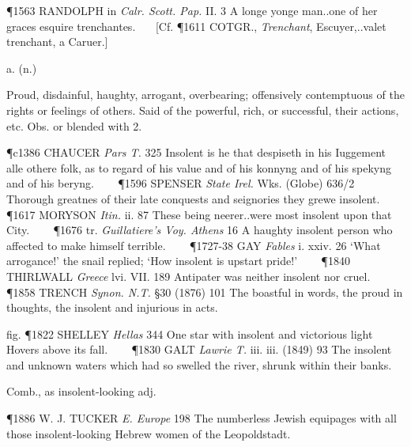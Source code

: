 \begin{description}[wide, labelwidth=!, labelindent=0pt]
\begin{myenumerate}
\P 1563 RANDOLPH in  \textit{Calr. Scott. Pap.} II. 3 A longe yonge man..one of her graces esquire trenchantes.    [Cf.
\P 1611 COTGR.,  \textit{Trenchant}, Escuyer,..valet trenchant, a Caruer.]
\end{myenumerate}


 a. (n.)

\noindent {}

\vspace{-0.3cm}

\begin{myenumerate}

  Proud, disdainful, haughty, arrogant, overbearing; offensively contemptuous of the rights or feelings of others. Said of the powerful, rich, or successful, their actions, etc. Obs. or blended with 2.

\P c1386 CHAUCER  \textit{Pars T.} 325 Insolent is he that despiseth in his Iuggement alle othere folk, as to regard of his value and of his konnyng and of his spekyng and of his beryng.    
\P 1596 SPENSER  \textit{State Irel.} Wks. (Globe) 636/2 Thorough greatnes of their late conquests and seignories they grewe insolent.    
\P 1617 MORYSON  \textit{Itin.} ii. 87 These being neerer..were most insolent upon that City.    
\P 1676 tr.  \textit{Guillatiere's Voy. Athens} 16 A haughty insolent person who affected to make himself terrible.    
\P 1727-38 GAY  \textit{Fables} i. xxiv. 26 ‘What arrogance!’ the snail replied; ‘How insolent is upstart pride!’    
\P 1840 THIRLWALL  \textit{Greece} lvi. VII. 189 Antipater was neither insolent nor cruel.    
\P 1858 TRENCH  \textit{Synon. N.T.} §30 (1876) 101 The boastful in words, the proud in thoughts, the insolent and injurious in acts.

\noindent fig. \P 1822 SHELLEY  \textit{Hellas} 344 One star with insolent and victorious light Hovers above its fall.    
\P 1830 GALT  \textit{Lawrie T.} iii. iii. (1849) 93 The insolent and unknown waters which had so swelled the river, shrunk within their banks.

 Comb., as insolent-looking adj.

\P 1886 W. J. TUCKER  \textit{E. Europe} 198 The numberless Jewish equipages with all those insolent-looking Hebrew women of the Leopoldstadt.


\end{myenumerate}
\end{description}
